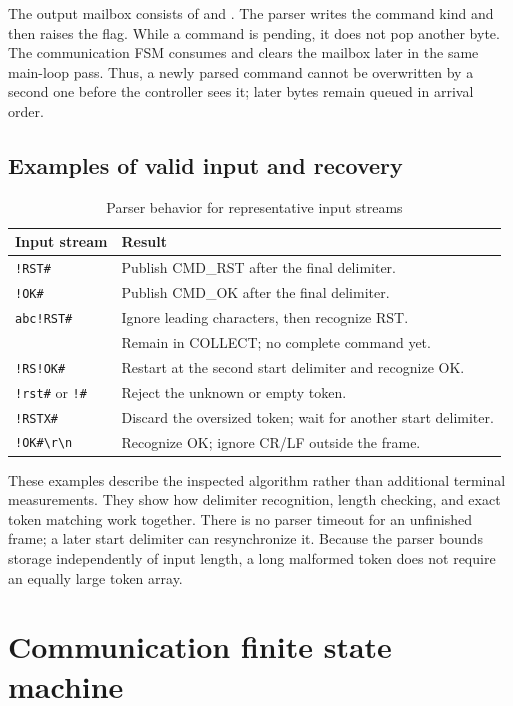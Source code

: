 \documentclass[a4paper]{article}
\newcommand{\code}[1]{\texttt{\detokenize{#1}}}
\newcommand{\topic}[1]{\subsection{#1}}
\begin{document}
The output mailbox consists of \code{command_data} and \code{command_flag}.
The parser writes the command kind and then raises the flag. While a command
is pending, it does not pop another byte. The communication FSM consumes and
clears the mailbox later in the same main-loop pass. Thus, a newly parsed
command cannot be overwritten by a second one before the controller sees it;
later bytes remain queued in arrival order.


\topic{Examples of valid input and recovery}

\begin{table}[htbp]\centering\small
\caption{Parser behavior for representative input streams}
\begin{tabular}{p{40mm}p{106mm}}\toprule
Input stream & Result\\\midrule
\texttt{!RST\#} & Publish CMD\_RST after the final delimiter.\\
\texttt{!OK\#} & Publish CMD\_OK after the final delimiter.\\
\texttt{abc!RST\#} & Ignore leading characters, then recognize RST.\\
\code{!RS} & Remain in COLLECT; no complete command yet.\\
\texttt{!RS!OK\#} & Restart at the second start delimiter and recognize OK.\\
\texttt{!rst\#} or \texttt{!\#} & Reject the unknown or empty token.\\
\texttt{!RSTX\#} & Discard the oversized token; wait for another start delimiter.\\
\texttt{!OK\#\textbackslash{}r\textbackslash{}n} & Recognize OK; ignore CR/LF outside the frame.\\\bottomrule
\end{tabular}\end{table}

These examples describe the inspected algorithm rather than additional
terminal measurements. They show how delimiter recognition, length checking,
and exact token matching work together. There is no parser timeout for an
unfinished frame; a later start delimiter can resynchronize it. Because the
parser bounds storage independently of input length, a long malformed token
does not require an equally large token array.


\section{Communication finite state machine}
\end{document}
